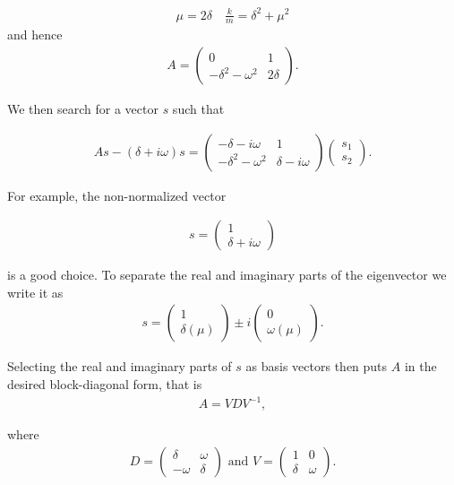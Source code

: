 \begin{solution}[4.4]
\begin{enumerate}
\begin{align}
\mu = 2\delta \quad \frac{k}{m} = \delta^2 + \mu^2
\end{align}
and hence
\begin{align}
A=\begin{pmatrix}0 & 1 \\ -\delta^2 -\omega^2 & 2\delta  \end{pmatrix}.
\end{align}

We then search for a vector $s$ such that 

\begin{align}
As-(\delta + i\omega)s =\begin{pmatrix}-\delta - i\omega & 1 \\ -\delta^2 -\omega^2 & \delta-i\omega  \end{pmatrix}   \begin{pmatrix} s_1 \\ s_2\end{pmatrix}.
\end{align}

For example, the non-normalized vector

\begin{align}
s = \begin{pmatrix} 1  \\ \delta + i\omega \end{pmatrix}
\end{align}

is a good choice. To separate the real and imaginary parts of the eigenvector we write it as 
\begin{align}
s= \begin{pmatrix} 1\\ \delta(\mu) \end{pmatrix}\pm i \begin{pmatrix} 0 \\ \omega(\mu) \end{pmatrix}.
\end{align}

Selecting the real and imaginary parts of $s$ as basis vectors then puts $A$ in the desired block-diagonal form,  that is 
\begin{align}
A=VDV^{-1},
\end{align}

where 
\begin{align}
D=\begin{pmatrix} \delta & \omega \\ -\omega & \delta \end{pmatrix} \text{ and } V=\begin{pmatrix} 1 & 0 \\ \delta & \omega  \end{pmatrix}.
\end{align}


\end{enumerate}
\end{solution}
